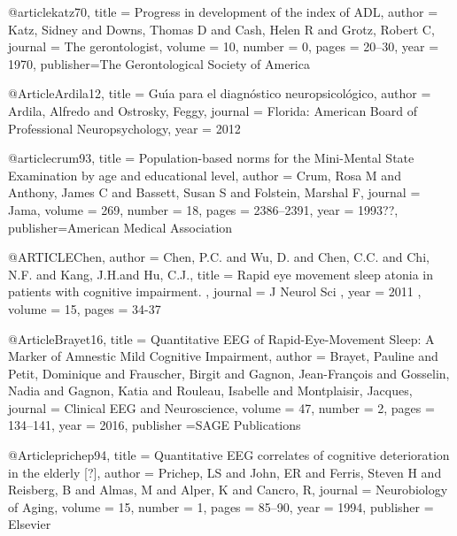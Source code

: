 @article{katz70,
    title   = {Progress in development of the index of ADL},
    author  = {Katz, Sidney 
               and Downs, Thomas D 
               and Cash, Helen R 
               and Grotz, Robert C},
    journal = {The gerontologist},
    volume  = {10},
    number  = {0},
    pages   = {20--30},
    year    = {1970},
    publisher={The Gerontological Society of America}
}

@Article{Ardila12,
    title   = {Gu{\'\i}a para el diagn{\'o}stico neuropsicol{\'o}gico},
    author  = {Ardila, Alfredo and Ostrosky, Feggy},
    journal = {Florida: American Board of Professional Neuropsychology},
    year    = {2012}
}

@article{crum93,
    title   = {{Population-based norms for the Mini-Mental State Examination by age and 
               educational level}},
    author  = {Crum, Rosa M 
               and Anthony, James C 
               and Bassett, Susan S 
               and Folstein, Marshal F},
    journal = {Jama},
    volume  = {269},
    number  = {18},
    pages   = {2386--2391},
    year    = {1993??},
    publisher={American Medical Association}
}

@ARTICLE{Chen,
author = {Chen, P.C. and Wu, D. and Chen, C.C. and Chi, N.F. and Kang, J.H.and Hu, C.J.},
title = {Rapid eye movement sleep atonia in patients with cognitive impairment. },
journal = {J Neurol Sci },
year = {2011 },
volume = {15},
pages = {34-37}
}

@Article{Brayet16,
    title   = {Quantitative {EEG} of {R}apid-{E}ye-{M}ovement {S}leep: {A} {M}arker of {A}mnestic 
               {M}ild {C}ognitive {I}mpairment},
    author  = {Brayet, Pauline 
               and Petit, Dominique 
               and Frauscher, Birgit 
               and Gagnon, Jean-Fran{\c{c}}ois 
               and Gosselin, Nadia 
               and Gagnon, Katia 
               and Rouleau, Isabelle 
               and Montplaisir, Jacques},
    journal = {Clinical {EEG} and {N}euroscience},
    volume  = {47},
    number  = {2},
    pages   = {134--141},
    year    = {2016},
    publisher ={SAGE Publications}
}

@Article{prichep94,
    title   = {Quantitative {EEG} correlates of cognitive deterioration in the elderly [?]},
    author  = {Prichep, LS 
               and John, ER 
               and Ferris, Steven H 
               and Reisberg, B 
               and Almas, M 
               and Alper, K 
               and Cancro, R},
    journal = {Neurobiology of Aging},
    volume  = {15},
    number  = {1},
    pages   = {85--90},
    year    = {1994},
    publisher = {Elsevier}
}

